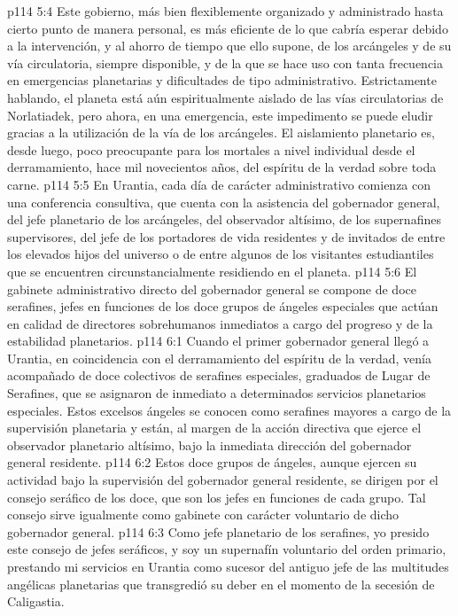 \vs p114 5:4 Este gobierno, más bien flexiblemente organizado y administrado hasta cierto punto de manera personal, es más eficiente de lo que cabría esperar debido a la intervención, y al ahorro de tiempo que ello supone, de los arcángeles y de su vía circulatoria, siempre disponible, y de la que se hace uso con tanta frecuencia en emergencias planetarias y dificultades de tipo administrativo. Estrictamente hablando, el planeta está aún espiritualmente aislado de las vías circulatorias de Norlatiadek, pero ahora, en una emergencia, este impedimento se puede eludir gracias a la utilización de la vía de los arcángeles. El aislamiento planetario es, desde luego, poco preocupante para los mortales a nivel individual desde el derramamiento, hace mil novecientos años, del espíritu de la verdad sobre toda carne.
\vs p114 5:5 \pc En Urantia, cada día de carácter administrativo comienza con una conferencia consultiva, que cuenta con la asistencia del gobernador general, del jefe planetario de los arcángeles, del observador altísimo, de los supernafines supervisores, del jefe de los portadores de vida residentes y de invitados de entre los elevados hijos del universo o de entre algunos de los visitantes estudiantiles que se encuentren circunstancialmente residiendo en el planeta.
\vs p114 5:6 El gabinete administrativo directo del gobernador general se compone de doce serafines, jefes en funciones de los doce grupos de ángeles especiales que actúan en calidad de directores sobrehumanos inmediatos a cargo del progreso y de la estabilidad planetarios.
\vs p114 6:1 Cuando el primer gobernador general llegó a Urantia, en coincidencia con el derramamiento del espíritu de la verdad, venía acompañado de doce colectivos de serafines especiales, graduados de Lugar de Serafines, que se asignaron de inmediato a determinados servicios planetarios especiales. Estos excelsos ángeles se conocen como serafines mayores a cargo de la supervisión planetaria y están, al margen de la acción directiva que ejerce el observador planetario altísimo, bajo la inmediata dirección del gobernador general residente.
\vs p114 6:2 Estos doce grupos de ángeles, aunque ejercen su actividad bajo la supervisión del gobernador general residente, se dirigen por el consejo seráfico de los doce, que son los jefes en funciones de cada grupo. Tal consejo sirve igualmente como gabinete con carácter voluntario de dicho gobernador general.
\vs p114 6:3 Como jefe planetario de los serafines, yo presido este consejo de jefes seráficos, y soy un supernafín voluntario del orden primario, prestando mi servicios en Urantia como sucesor del antiguo jefe de las multitudes angélicas planetarias que transgredió su deber en el momento de la secesión de Caligastia.
